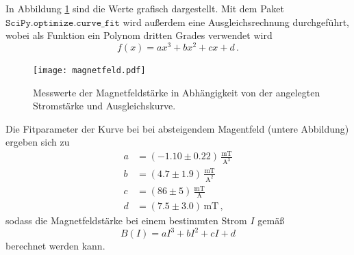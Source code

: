 \FloatBarrier
\noindent
In Abbildung \ref{fig:afig1} sind die Werte grafisch dargestellt. Mit dem Paket $\texttt{SciPy.optimize.curve\_fit}$ wird außerdem 
eine Ausgleichsrechnung durchgeführt, wobei als Funktion ein Polynom dritten Grades verwendet wird
\begin{equation*}
    f \left(x\right) = a x^3 +b x^2 +c x +d \, .
\end{equation*}
\FloatBarrier
\begin{figure}
    \centering
    \texttt{[image: magnetfeld.pdf]}
    \caption{Messwerte der Magnetfeldstärke in Abhängigkeit von der angelegten Stromstärke und Ausgleichskurve.}
    \label{fig:afig1}
\end{figure}
\FloatBarrier
Die Fitparameter der Kurve bei bei absteigendem Magentfeld (untere Abbildung) ergeben sich zu 
\begin{align*}
    a &= \left(-1.10 \pm 0.22\right) \, \frac{\text{mT}}{\text{A}^3} \\
    b &= \left(4.7\pm 1.9\right) \, \frac{\text{mT}}{\text{A}^2} \\
    c &= \left(86 \pm 5\right) \, \frac{\text{mT}}{\text{A}} \\
    d &= \left(7.5 \pm 3.0\right) \, \text{mT} \, ,
\end{align*}
sodass die Magnetfeldstärke bei einem bestimmten Strom $I$ gemäß
\begin{equation}
    \label{eq:tansania}
    B(I) = a I^3 + b I^2 + c I + d 
\end{equation}
berechnet werden kann.

